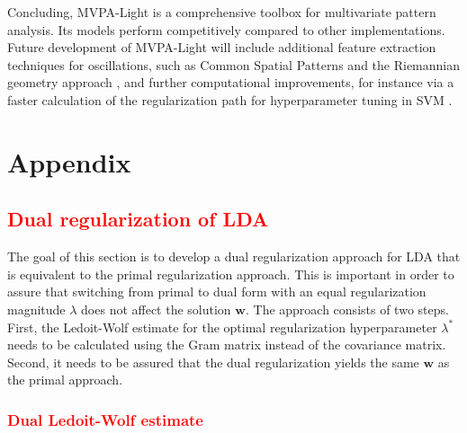 \documentclass[utf8]{frontiersSCNS} %
\newcommand{\w}{\mathbf{w}}
\newcommand{\ttt}[1]{\texttt{#1}}
\newcommand{\red}[1]{\textcolor{red}{#1}}
\begin{document}

Concluding, MVPA-Light is a comprehensive toolbox for multivariate pattern analysis. Its models perform competitively compared to other implementations. Future development of MVPA-Light will include additional feature extraction techniques for oscillations, such as Common Spatial Patterns \citep{Blankertz2008a} and the Riemannian geometry approach \citep{Barachant2013}, and further computational improvements, for instance via a faster calculation of the regularization path for hyperparameter tuning in SVM \citep{Hastie2004TheMachine}.

\section{Appendix}

\red{\subsection{Dual regularization of LDA}\label{app:dualLDA}}

The goal of this section is to develop a dual regularization approach for LDA that is equivalent to the primal regularization approach. This is important in order to assure that switching from primal to dual form with an equal regularization magnitude $\lambda$ does not affect the solution $\w$. The approach consists of two steps. First, the Ledoit-Wolf estimate for the optimal regularization hyperparameter $\lambda^*$ needs to be calculated using the Gram matrix instead of the covariance matrix. Second, it needs to be assured that the dual regularization yields the same $\w$ as the primal approach.

\red{\subsubsection{Dual Ledoit-Wolf estimate}}
\end{document}
